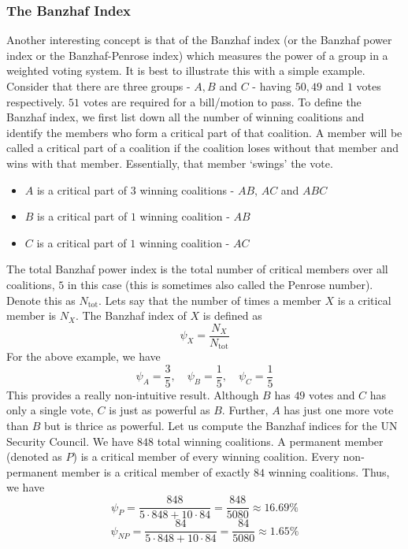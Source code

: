 \documentclass{article}
\theoremstyle{definition}
\begin{document}
\subsubsection{The Banzhaf Index}

Another interesting concept is that of the Banzhaf index (or the Banzhaf power index or the Banzhaf-Penrose index) which measures the power of a group in a weighted voting system. It is best to illustrate this with a simple example. Consider that there are three groups - $A,B$ and $C$ - having $50,49$ and $1$ votes respectively. $51$ votes are required for a bill/motion to pass. To define the Banzhaf index, we first list down all the number of winning coalitions and identify the members who form a critical part of that coalition.
A member will be called a critical part of a coalition if the coalition loses without that member and wins with that member. Essentially, that member `swings' the vote.

\begin{itemize}
    \item $A$ is a critical part of $3$ winning coalitions - $AB$, $AC$ and $ABC$
    \item $B$ is a critical part of $1$ winning coalition - $AB$
    \item $C$ is a critical part of $1$ winning coalition - $AC$
\end{itemize}

The total Banzhaf power index is the total number of critical members over all coalitions, $5$ in this case (this is sometimes also called the Penrose number). Denote this as $N_{\text{tot}}$. Lets say that the number of times a member $X$ is a critical member is $N_X$. The Banzhaf index of $X$ is defined as
\[
    \psi_X = \frac{N_X}{N_{\text{tot}}}
\]
For the above example, we have
\[
    \psi_A = \frac{3}{5}, \quad \psi_B = \frac{1}{5}, \quad \psi_C = \frac{1}{5}
\]
This provides a really non-intuitive result. Although $B$ has $49$ votes and $C$ has only a single vote, $C$ is just as powerful as $B$. Further, $A$ has just one more vote than $B$ but is thrice as powerful. Let us compute the Banzhaf indices for the UN Security Council. We have $848$ total winning coalitions. A permanent member (denoted as $P$) is a critical member of every winning coalition. Every non-permanent member is a critical member of exactly $84$ winning coalitions. Thus, we have
\[
    \psi_P = \frac{848}{5 \cdot 848 + 10 \cdot 84} = \frac{848}{5080} \approx 16.69 \%
\]  
\[
    \psi_{NP} = \frac{84}{5 \cdot 848 + 10 \cdot 84} = \frac{84}{5080} \approx 1.65 \%
\]
\end{document}
